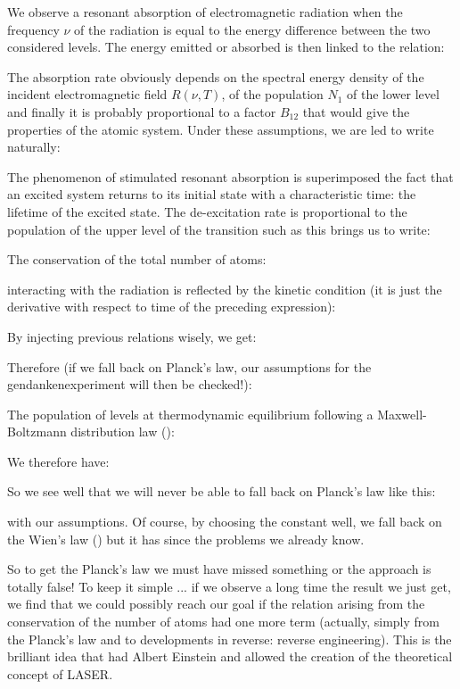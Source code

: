 	We observe a resonant absorption of electromagnetic radiation when the frequency $\nu$ of the radiation is equal to the energy difference between the two considered levels. The energy emitted or absorbed is then linked to the relation:
	
	The absorption rate obviously depends on the spectral energy density of the incident electromagnetic field $R(\nu,T)$, of the population $N_1$ of the lower level and finally it is probably proportional to a factor $B_{12}$ that would give the properties of the atomic system. Under these assumptions, we are led to write naturally:
	
	The phenomenon of stimulated resonant absorption is superimposed the fact that an excited system returns to its initial state with a characteristic time: the lifetime of the excited state. The de-excitation rate is proportional to the population of the upper level of the transition such as this brings us to write:
	
	The conservation of the total number of atoms:
	
	interacting with the radiation is reflected by the kinetic condition (it is just the derivative with respect to time of the preceding expression):
	
	By injecting previous relations wisely, we get:
	
	Therefore (if we fall back on Planck's law, our assumptions for the gendankenexperiment will then be checked!):
	
	The population of levels at thermodynamic equilibrium following a Maxwell-Boltzmann distribution law ():
	
	We therefore have:
	
	So we see well that we will never be able to fall back on Planck's law like this:
	
	with our assumptions. Of course, by choosing the constant well, we fall back on the Wien's law () but it has since the problems we already know.

	So to get the Planck's law we must have missed something or the approach is totally false! To keep it simple ... if we observe a long time the result we just get, we find that we could possibly reach our goal if the relation arising from the conservation of the number of atoms had one more term (actually, simply from the Planck's law and to developments in reverse: reverse engineering). This is the brilliant idea that had Albert Einstein and allowed the creation of the theoretical concept of LASER.

